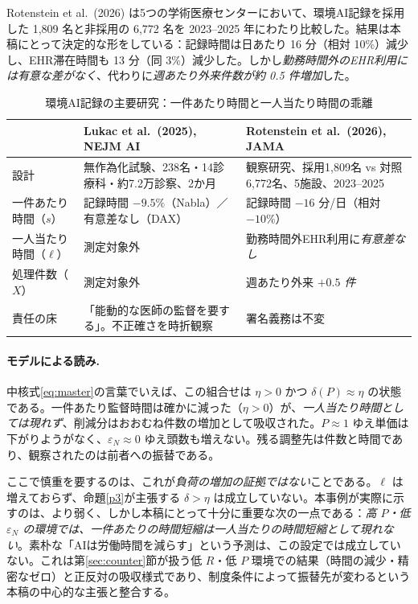 \documentclass[11pt]{article}
\theoremstyle{plain}
\theoremstyle{definition}
\theoremstyle{remark}
\begin{document}
Rotenstein et al.\ (2026) は5つの学術医療センターにおいて、環境AI記録を採用した 1{,}809 名と非採用の 6{,}772 名を 2023--2025 年にわたり比較した。結果は本稿にとって決定的な形をしている：記録時間は日あたり 16 分（相対 10\%）減少し、EHR滞在時間も 13 分（同 3\%）減少した。しかし\emph{勤務時間外のEHR利用には有意な差がなく}、代わりに\emph{週あたり外来件数が約 0.5 件増加}した。

\begin{table}[h]\centering\small
\caption{環境AI記録の主要研究：一件あたり時間と一人当たり時間の乖離}\label{tab:scribe}
\begin{tabularx}{\textwidth}{@{}lXX@{}}
\toprule
 & Lukac et al.\ (2025), NEJM AI & Rotenstein et al.\ (2026), JAMA \\ \midrule
設計 & 無作為化試験、238名・14診療科・約7.2万診察、2か月 & 観察研究、採用1{,}809名 vs 対照6{,}772名、5施設、2023--2025 \\
一件あたり時間（$s$） & 記録時間 $-9.5\%$（Nabla）／有意差なし（DAX） & 記録時間 $-16$ 分/日（相対 $-10\%$） \\
一人当たり時間（$\ell$） & 測定対象外 & 勤務時間外EHR利用に\emph{有意差なし} \\
処理件数（$X$） & 測定対象外 & 週あたり外来 \emph{$+0.5$ 件} \\
責任の床 & 「能動的な医師の監督を要する」。不正確さを時折観察 & 署名義務は不変 \\
\bottomrule
\end{tabularx}
\end{table}

\paragraph{モデルによる読み.}
中核式\eqref{eq:master}の言葉でいえば、この組合せは $\eta>0$ かつ $\delta(P)\approx\eta$ の状態である。一件あたり監督時間は確かに減った（$\eta>0$）が、\emph{一人当たり時間としては現れず}、削減分はおおむね件数の増加として吸収された。$P\approx1$ ゆえ単価は下がりようがなく、$\varepsilon_N\approx0$ ゆえ頭数も増えない。残る調整先は件数と時間であり、観察されたのは前者への振替である。

ここで慎重を要するのは、これが\emph{負荷の増加の証拠ではない}ことである。$\ell$ は増えておらず、命題\ref{p3}が主張する $\delta>\eta$ は成立していない。本事例が実際に示すのは、より弱く、しかし本稿にとって十分に重要な次の一点である：\emph{高 $P$・低 $\varepsilon_N$ の環境では、一件あたりの時間短縮は一人当たりの時間短縮として現れない}。素朴な「AIは労働時間を減らす」という予測は、この設定では成立していない。これは第\ref{sec:counter}節が扱う低 $R$・低 $P$ 環境での結果（時間の減少・精密なゼロ）と正反対の吸収様式であり、制度条件によって振替先が変わるという本稿の中心的な主張と整合する。
\end{document}
